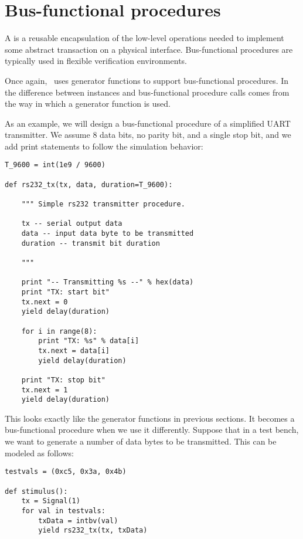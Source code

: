 \section{Bus-functional procedures \label{intro-bfm}}

%
A  is a reusable encapsulation of the
low-level operations needed to implement some abstract transaction on
a physical interface. Bus-functional procedures are typically used in
flexible verification environments.

Once again, \myhdl\ uses generator functions to support
bus-functional procedures. In \myhdl\, the difference between
instances and bus-functional procedure calls comes from the way in
which a generator function is used.

As an example, we will design a bus-functional procedure of a
simplified UART transmitter. We assume 8 data bits, no parity bit, and
a single stop bit, and we add print statements to follow the
simulation behavior:

\begin{verbatim}
T_9600 = int(1e9 / 9600)

def rs232_tx(tx, data, duration=T_9600):
    
    """ Simple rs232 transmitter procedure.

    tx -- serial output data
    data -- input data byte to be transmitted
    duration -- transmit bit duration
    
    """

    print "-- Transmitting %s --" % hex(data)
    print "TX: start bit"      
    tx.next = 0
    yield delay(duration)

    for i in range(8):
        print "TX: %s" % data[i]
        tx.next = data[i]
        yield delay(duration)

    print "TX: stop bit"      
    tx.next = 1
    yield delay(duration)
\end{verbatim}

This looks exactly like the generator functions in previous sections. It
becomes a bus-functional procedure when we use it differently. Suppose
that in a test bench, we want to generate a number of data bytes to be
transmitted. This can be modeled as follows:


\begin{verbatim}
testvals = (0xc5, 0x3a, 0x4b)

def stimulus():
    tx = Signal(1)
    for val in testvals:
        txData = intbv(val)
        yield rs232_tx(tx, txData)
\end{verbatim}

